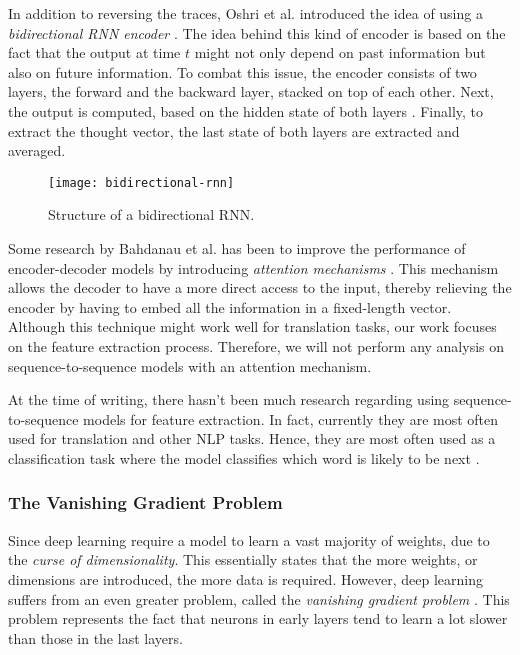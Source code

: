 In addition to reversing the traces, Oshri et al. introduced the idea of using a \textit{bidirectional RNN encoder} \cite{rnnencoder}.
The idea behind this kind of encoder is based on the fact that the output at time $t$ might not only depend on past information but also on future information.
To combat this issue, the encoder consists of two layers, the forward and the backward layer, stacked on top of each other.
Next, the output is computed, based on the hidden state of both layers \cite{britz_2016}.
Finally, to extract the thought vector, the last state of both layers are extracted and averaged.

\begin{figure}[h]
  \centering
  \texttt{[image: bidirectional-rnn]}
  \caption{Structure of a bidirectional RNN. \cite{britz_2016}}
  \label{fig:bidirectional-rnn}
\end{figure}

\newpage

Some research by Bahdanau et al. has been to improve the performance of encoder-decoder models by introducing \textit{attention mechanisms} \cite{attention_mechanisms}.
This mechanism allows the decoder to have a more direct access to the input, thereby relieving the encoder by having to embed all the information in a fixed-length vector.
Although this technique might work well for translation tasks, our work focuses on the feature extraction process.
Therefore, we will not perform any analysis on sequence-to-sequence models with an attention mechanism.

At the time of writing, there hasn't been much research regarding using sequence-to-sequence models for feature extraction.
In fact, currently they are most often used for translation and other NLP tasks.
Hence, they are most often used as a classification task where the model classifies which word is likely to be next \cite{tensorflowseq2seq,cho2014learning,rnnencoder,sutskever_vinyals_le}.

\subsubsection{The Vanishing Gradient Problem}

Since deep learning require a model to learn a vast majority of weights, due to the \textit{curse of dimensionality}.
This essentially states that the more weights, or dimensions are introduced, the more data is required.
However, deep learning suffers from an even greater problem, called the \textit{vanishing gradient problem} \cite{nielsen_2017}.
This problem represents the fact that neurons in early layers tend to learn a lot slower than those in the last layers.

